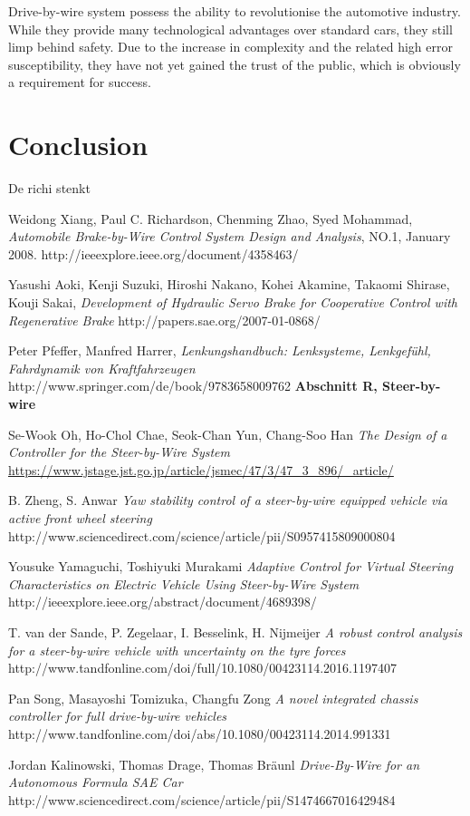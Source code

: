 \documentclass[conference]{IEEEtran}
\begin{document}
Drive-by-wire system possess the ability to revolutionise the automotive industry. While they provide many technological advantages over standard cars, they still limp behind safety. Due to the increase in complexity and the related high error susceptibility, they have not yet gained the trust of the public, which is obviously a requirement for  success.

\section{Conclusion}

De richi stenkt 

\begin{thebibliography}{1}
Weidong Xiang, Paul C. Richardson, Chenming Zhao, Syed Mohammad, 
\emph{Automobile Brake-by-Wire Control System Design and Analysis}, 
NO.1, January 2008.
http://ieeexplore.ieee.org/document/4358463/

Yasushi Aoki, Kenji Suzuki, Hiroshi Nakano, Kohei Akamine, Takaomi Shirase, Kouji Sakai, 
\emph{Development of Hydraulic Servo Brake for Cooperative Control with Regenerative Brake}
http://papers.sae.org/2007-01-0868/

Peter Pfeffer, Manfred Harrer, \emph{Lenkungshandbuch: Lenksysteme, Lenkgefühl, Fahrdynamik von Kraftfahrzeugen} http://www.springer.com/de/book/9783658009762
\textbf{Abschnitt R, Steer-by-wire}

Se-Wook Oh, Ho-Chol Chae, Seok-Chan Yun, Chang-Soo Han
\emph{The Design of a Controller for the Steer-by-Wire System}
\url{https://www.jstage.jst.go.jp/article/jsmec/47/3/47_3_896/_article/}

B. Zheng, S. Anwar
\emph{Yaw stability control of a steer-by-wire equipped vehicle via active front wheel steering}
http://www.sciencedirect.com/science/article/pii/S0957415809000804

Yousuke Yamaguchi, Toshiyuki Murakami
\emph{Adaptive Control for Virtual Steering Characteristics on Electric Vehicle Using Steer-by-Wire System}
http://ieeexplore.ieee.org/abstract/document/4689398/

T. van der Sande, P. Zegelaar, I. Besselink, H. Nijmeijer
\emph{A robust control analysis for a steer-by-wire vehicle with uncertainty on the tyre forces}
http://www.tandfonline.com/doi/full/10.1080/00423114.2016.1197407

Pan Song, Masayoshi Tomizuka, Changfu Zong
\emph{A novel integrated chassis controller for full drive-by-wire vehicles}
http://www.tandfonline.com/doi/abs/10.1080/00423114.2014.991331

Jordan Kalinowski, Thomas Drage, Thomas Bräunl
\emph{Drive-By-Wire for an Autonomous Formula SAE Car}
http://www.sciencedirect.com/science/article/pii/S1474667016429484



\end{thebibliography}
\end{document}
